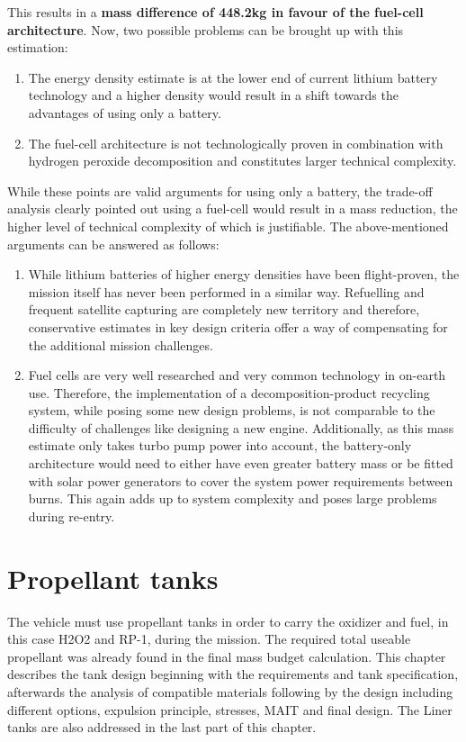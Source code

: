 This results in a \textbf{mass difference of 448.2kg in favour of the fuel-cell architecture}. Now, two possible problems can be brought up with this estimation:
\begin{enumerate}
	\item	The energy density estimate is at the lower end of current lithium battery technology and a higher density would result in a shift towards the advantages of using only a battery.
	\item	The fuel-cell architecture is not technologically proven in combination with hydrogen peroxide decomposition and constitutes larger technical complexity.
\end{enumerate}

While these points are valid arguments for using only a battery, the trade-off analysis clearly pointed out using a fuel-cell would result in a mass reduction, the higher level of technical complexity of which is justifiable. The above-mentioned arguments can be answered as follows:
\begin{enumerate}
	\item	While lithium batteries of higher energy densities have been flight-proven, the mission itself has never been performed in a similar way. Refuelling and frequent satellite capturing are completely new territory and therefore, conservative estimates in key design criteria offer a way of compensating for the additional mission challenges.
	\item	Fuel cells are very well researched and very common technology in on-earth use. Therefore, the implementation of a decomposition-product recycling system, while posing some new design problems, is not comparable to the difficulty of challenges like designing a new engine. Additionally, as this mass estimate only takes turbo pump power into account, the battery-only architecture would need to either have even greater battery mass or be fitted with solar power generators to cover the system power requirements between burns. This again adds up to system complexity and poses large problems during re-entry.
	
\end{enumerate}
\section{Propellant tanks}
The vehicle must use propellant tanks in order to carry the oxidizer and fuel, in this case H2O2 and RP-1, during the mission. The required total useable propellant was already found in the final mass budget calculation. 
This chapter describes the tank design beginning with the requirements and tank specification, afterwards the analysis of compatible materials following by the design including different options, expulsion principle, stresses, MAIT and final design. The Liner tanks are also addressed in the last part of this chapter.\\

